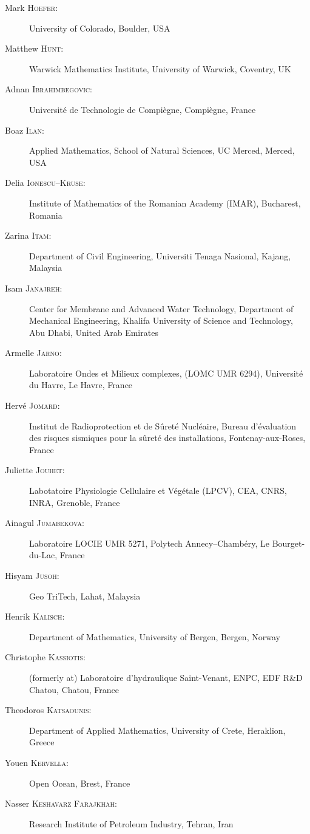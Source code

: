 \documentclass[final, a4paper, oneside, 12pt]{article}
\numberwithin{equation}{section}
\begin{document}
\begin{description}
  \item[Mark \textsc{Hoefer}:] University of Colorado, Boulder, USA
  \item[Matthew \textsc{Hunt}:] Warwick Mathematics Institute, University of Warwick, Coventry, UK
  \item[Adnan \textsc{Ibrahimbegovic}:] Universit\'e de Technologie de Compi\`egne, Compi\`egne, France
  \item[Boaz \textsc{Ilan}:] Applied Mathematics, School of Natural Sciences, UC Merced, Merced, USA
  \item[Delia \textsc{Ionescu--Kruse}:] Institute of Mathematics of the Romanian Academy (IMAR), Bucharest, Romania
  \item[Zarina \textsc{Itam}:] Department of Civil Engineering, Universiti Tenaga Nasional, Kajang, Malaysia
  \item[Isam \textsc{Janajreh}:] Center for Membrane and Advanced Water Technology, Department of Mechanical Engineering, Khalifa University of Science and Technology, Abu Dhabi, United Arab Emirates
  \item[Armelle \textsc{Jarno}:] Laboratoire Ondes et Milieux complexes, (LOMC UMR 6294), Universit\'e du Havre, Le Havre, France
  \item[Herv\'e \textsc{Jomard}:] Institut de Radioprotection et de S\^uret\'e Nucl\'eaire, Bureau d'\'evaluation des risques sismiques pour la s\^uret\'e des installations, Fontenay-aux-Roses, France
  \item[Juliette \textsc{Jouhet}:] Labotatoire Physiologie Cellulaire et V\'eg\'etale (LPCV), CEA, CNRS, INRA, Grenoble, France
  \item[Ainagul \textsc{Jumabekova}:] Laboratoire LOCIE UMR 5271, Polytech Annecy--Chamb\'ery, Le Bourget-du-Lac, France
  \item[Hisyam \textsc{Jusoh}:] Geo TriTech, Lahat, Malaysia
  \item[Henrik \textsc{Kalisch}:] Department of Mathematics, University of Bergen, Bergen, Norway
  \item[Christophe \textsc{Kassiotis}:] (formerly at) Laboratoire d'hydraulique Saint-Venant, ENPC, EDF R\&D Chatou, Chatou, France
  \item[Theodoros \textsc{Katsaounis}:] Department of Applied Mathematics, University of Crete, Heraklion, Greece
  \item[Youen \textsc{Kervella}:] Open Ocean, Brest, France
  \item[Nasser \textsc{Keshavarz Farajkhah}:] Research Institute of Petroleum Industry, Tehran, Iran

\end{description}
\end{document}
